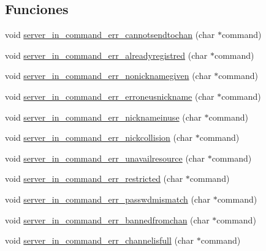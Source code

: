 \subsection*{Funciones}
\begin{DoxyCompactItemize}
\item 
void \hyperlink{G-2313-06-P2__client__err__handlers_8c_aee5973ae831d1c7c63b1a62b59f561c2}{server\+\_\+in\+\_\+command\+\_\+err\+\_\+cannotsendtochan} (char $\ast$command)
\item 
void \hyperlink{G-2313-06-P2__client__err__handlers_8c_a14bfb17eb95d0f2bef1869aa2ebf520c}{server\+\_\+in\+\_\+command\+\_\+err\+\_\+alreadyregistred} (char $\ast$command)
\item 
void \hyperlink{G-2313-06-P2__client__err__handlers_8c_aaa9cfb1b5050bd1218c227d8d0a041fe}{server\+\_\+in\+\_\+command\+\_\+err\+\_\+nonicknamegiven} (char $\ast$command)
\item 
void \hyperlink{G-2313-06-P2__client__err__handlers_8c_abeb8ead21ebba982eb59f161eda735cb}{server\+\_\+in\+\_\+command\+\_\+err\+\_\+erroneusnickname} (char $\ast$command)
\item 
void \hyperlink{G-2313-06-P2__client__err__handlers_8c_ab6d8f2d05566bf6ee9dfcfc4a20f5d23}{server\+\_\+in\+\_\+command\+\_\+err\+\_\+nicknameinuse} (char $\ast$command)
\item 
void \hyperlink{G-2313-06-P2__client__err__handlers_8c_a4af95b292b293c08c0989b4e7334c7eb}{server\+\_\+in\+\_\+command\+\_\+err\+\_\+nickcollision} (char $\ast$command)
\item 
void \hyperlink{G-2313-06-P2__client__err__handlers_8c_ae4fcb567dc7685f5d7a4abbc7c6506b4}{server\+\_\+in\+\_\+command\+\_\+err\+\_\+unavailresource} (char $\ast$command)
\item 
void \hyperlink{G-2313-06-P2__client__err__handlers_8c_ada432444f58d5effbb05fd558a8ce289}{server\+\_\+in\+\_\+command\+\_\+err\+\_\+restricted} (char $\ast$command)
\item 
void \hyperlink{G-2313-06-P2__client__err__handlers_8c_a548a7ad35236521dca4b829e466f3379}{server\+\_\+in\+\_\+command\+\_\+err\+\_\+passwdmismatch} (char $\ast$command)
\item 
void \hyperlink{G-2313-06-P2__client__err__handlers_8c_a0e4059ef132eaac2218fdd89b20ca852}{server\+\_\+in\+\_\+command\+\_\+err\+\_\+bannedfromchan} (char $\ast$command)
\item 
void \hyperlink{G-2313-06-P2__client__err__handlers_8c_a05db0aa32f2ec2925cba3b952435bf59}{server\+\_\+in\+\_\+command\+\_\+err\+\_\+channelisfull} (char $\ast$command)

\end{DoxyCompactItemize}
